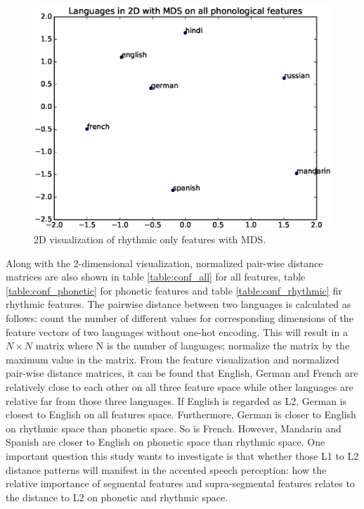 \begin{figure}[!htb]
  \includegraphics[width=\linewidth]{figures/rhythmic_MDS.eps}
  \caption{2D visualization of rhythmic only features with MDS.}\label{fig:rhythmic_mds}
\endminipage
\end{figure}

Along with the 2-dimensional visualization, normalized pair-wise distance matrices are also shown in table \ref{table:conf_all} for all features, table \ref{table:conf_phonetic} for phonetic features and table \ref{table:conf_rhythmic} fir rhythmic features. The pairwise distance between two languages is calculated as follows: count the number of different values for corresponding dimensions of the feature vectors of two languages without one-hot encoding. This will result in a $N \times N$ matrix where N is the number of languages; normalize the matrix by the maximum value in the matrix. From the feature visualization and normalized pair-wise distance matrices, it can be found that English, German and French are relatively close to each other on all three feature space while other languages are relative far from those three languages. If English is regarded as L2, German is closest to English on all features space. Furthermore, German is closer to English on rhythmic space than phonetic space. So is French. However, Mandarin and Spanish are closer to English on phonetic space than rhythmic space. One important question this study wants to investigate is that whether those L1 to L2 distance patterns will manifest in the accented speech perception: how the relative importance of segmental features and supra-segmental features relates to the distance to L2 on phonetic and rhythmic space.

